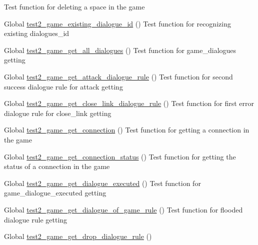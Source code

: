 \begin{DoxyRefList}
%
Test function for deleting a space in the game  
\item[Global \mbox{\hyperlink{game__test_8c_ad81853d0a3264aa9ab15885f99ff6309}{test2\+\_\+game\+\_\+existing\+\_\+dialogue\+\_\+id}} ()]\label{test__test000287}%
%
Test function for recognizing existing dialogues\+\_\+id  
\item[Global \mbox{\hyperlink{game__test_8c_a7bacc4ccc46c52955722d6123d89c998}{test2\+\_\+game\+\_\+get\+\_\+all\+\_\+dialogues}} ()]\label{test__test000393}%
%
Test function for game\+\_\+dialogues getting  
\item[Global \mbox{\hyperlink{game__test_8c_af82012c03a2c5f92998453ab74ab8953}{test2\+\_\+game\+\_\+get\+\_\+attack\+\_\+dialogue\+\_\+rule}} ()]\label{test__test000332}%
%
Test function for second success dialogue rule for attack getting  
\item[Global \mbox{\hyperlink{game__test_8c_afedafe807cd2e24dd347deb7d565d0e6}{test2\+\_\+game\+\_\+get\+\_\+close\+\_\+link\+\_\+dialogue\+\_\+rule}} ()]\label{test__test000378}%
%
Test function for first error dialogue rule for close\+\_\+link getting  
\item[Global \mbox{\hyperlink{game__test_8c_a470cfbf8141add43010f03bf884af802}{test2\+\_\+game\+\_\+get\+\_\+connection}} ()]\label{test__test000259}%
%
Test function for getting a connection in the game  
\item[Global \mbox{\hyperlink{game__test_8c_a86e9504122661dc32899a105166555cb}{test2\+\_\+game\+\_\+get\+\_\+connection\+\_\+status}} ()]\label{test__test000256}%
%
Test function for getting the status of a connection in the game  
\item[Global \mbox{\hyperlink{game__test_8c_a413a51add5b89071834794e5a220f933}{test2\+\_\+game\+\_\+get\+\_\+dialogue\+\_\+executed}} ()]\label{test__test000300}%
%
Test function for game\+\_\+dialogue\+\_\+executed getting  
\item[Global \mbox{\hyperlink{game__test_8c_a8cada371823d94f71ceaee03d13ac70a}{test2\+\_\+game\+\_\+get\+\_\+dialogue\+\_\+of\+\_\+game\+\_\+rule}} ()]\label{test__test000388}%
%
Test function for flooded dialogue rule getting  
\item[Global \mbox{\hyperlink{game__test_8c_a4dbdbeeb44ba483c2cd90796edef9e3f}{test2\+\_\+game\+\_\+get\+\_\+drop\+\_\+dialogue\+\_\+rule}} ()]\label{test__test000345}%

\end{DoxyRefList}

